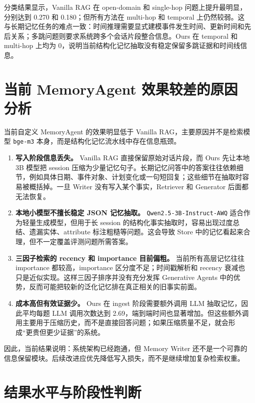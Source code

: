 \documentclass[UTF8,a4paper,11pt]{ctexart}
\begin{document}
分类结果显示，Vanilla RAG 在 open-domain 和 single-hop 问题上提升最明显，分别达到 0.270 和 0.180；但所有方法在 multi-hop 和 temporal 上仍然较弱。这与长期记忆任务的难点一致：时间推理需要显式建模事件发生时间、更新时间和先后关系；多跳问题则要求系统跨多个会话片段整合信息。Ours 在 temporal 和 multi-hop 上均为 0，说明当前结构化记忆抽取没有稳定保留多跳证据和时间线信息。

\section{当前 MemoryAgent 效果较差的原因分析}

当前自定义 MemoryAgent 的效果明显低于 Vanilla RAG，主要原因并不是检索模型 \texttt{bge-m3} 本身，而是结构化记忆流水线中存在信息瓶颈。

\begin{enumerate}
  \item \textbf{写入阶段信息丢失。} Vanilla RAG 直接保留原始对话片段，而 Ours 先让本地 3B 模型把 session 压缩为少量记忆句子。长期记忆问答中的答案往往依赖细节，例如具体日期、事件对象、计划变化或一句短回复；这些细节在抽取时容易被概括掉。一旦 Writer 没有写入某个事实，Retriever 和 Generator 后面都无法恢复。
  \item \textbf{本地小模型不擅长稳定 JSON 记忆抽取。} \texttt{Qwen2.5-3B-Instruct-AWQ} 适合作为轻量生成模型，但用于长 session 的结构化事实抽取时，容易出现过度总结、遗漏实体、attribute 标注粗糙等问题。这会导致 Store 中的记忆看起来合理，但不一定覆盖评测问题所需答案。
  \item \textbf{三因子检索的 recency 和 importance 目前偏粗。} 当前所有高层记忆往往 importance 都较高，importance 区分度不足；时间戳解析和 recency 衰减也只是近似实现。这样三因子排序并没有充分发挥 Generative Agents 中的优势，反而可能把较新的泛化记忆排在真正相关的旧事实前面。
  \item \textbf{成本高但有效证据少。} Ours 在 ingest 阶段需要额外调用 LLM 抽取记忆，因此平均每题 LLM 调用次数达到 2.69，端到端时间也显著增加。但这些额外调用主要用于压缩历史，而不是直接回答问题；如果压缩质量不足，就会形成“更贵但更少证据”的系统。
\end{enumerate}

因此，当前结果说明：系统架构已经跑通，但 Memory Writer 还不是一个可靠的信息保留模块。后续改进应优先降低写入损失，而不是继续增加复杂检索权重。

\section{结果水平与阶段性判断}
\end{document}
